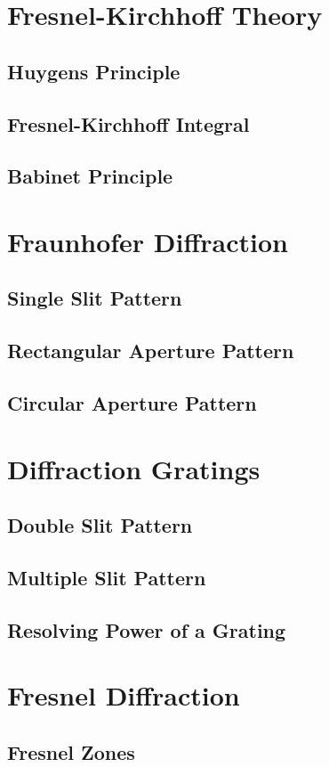 \documentclass[../electromagnetism.tex]{subfiles}
\begin{document}
\section{Fresnel-Kirchhoff Theory}
\lipsum
\subsection{Huygens Principle}
\subsection{Fresnel-Kirchhoff Integral}
\subsection{Babinet Principle}
\section{Fraunhofer Diffraction}
\subsection{Single Slit Pattern}
\subsection{Rectangular Aperture Pattern}
\subsection{Circular Aperture Pattern}
\section{Diffraction Gratings}
\subsection{Double Slit Pattern}
\subsection{Multiple Slit Pattern}
\subsection{Resolving Power of a Grating}
\section{Fresnel Diffraction}
\subsection{Fresnel Zones}
\end{document}
